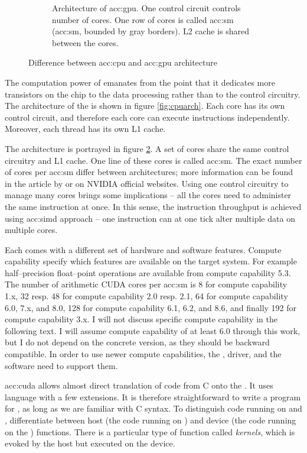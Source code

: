 \begin{figure}
\begin{subfigure}[t]{0.47\textwidth}
        \caption{Architecture of \acrshort*{acc:gpu}. One control circuit controls number of cores. One row of cores is called \acrlong{acc:sm} (\acrshort{acc:sm}, bounded by gray borders). L2 cache is shared between the cores.}
        \label{fig:gpuarch}
    \end{subfigure}
    \caption{Difference between \acrshort*{acc:cpu} and \acrshort*{acc:gpu} architecture}
\end{figure}

The computation power of \gpu emanates from the point that it dedicates more transistors on the chip to the data processing rather than to the control circuitry. The architecture of the \cpu is shown in figure \ref{fig:cpuarch}. Each core has its own control circuit, and therefore each core can execute instructions independently. Moreover, each thread has its own L1 cache.

The \gpu{} architecture is portrayed in figure \ref{fig:gpuarch}. A set of cores share the same control circuitry and L1 cache. One line of these cores is called \acrfull{acc:sm}. The exact number of cores per \acrshort{acc:sm} differ between architectures; more information can be found in the article by \citet{NVIDIAhistory} or on NVIDIA official websites. Using one control circuitry to manage many cores brings some implications -- all the cores need to administer the same instruction at once. In this sense, the instruction throughput is achieved using \acrfull{acc:simd} approach -- one instruction can at one tick alter multiple data on multiple cores.

Each \gpu comes with a different set of hardware and software features. Compute capability specify which features are available on the target system. For example half--precision float--point operations are available from compute capability 5.3. The number of arithmetic CUDA cores per \acrshort{acc:sm} is 8 for compute capability 1.x, 32 resp. 48 for compute capability 2.0 resp. 2.1, 64 for compute capability 6.0, 7.x, and 8.0, 128 for compute capability 6.1, 6.2, and 8.6, and finally 192 for compute capability 3.x. I will not discuss specific compute capability in the following text. I will assume compute capability of at least 6.0 through this work, but I do not depend on the concrete version, as they should be backward compatible. In order to use newer compute capabilities, the \gpu, driver, and the software need to support them.

\acrlong{acc:cuda} allows almost direct translation of code from C onto the \gpu. It uses \cpp language with a few extensions. It is therefore straightforward to write a program for \gpuns, as long as we are familiar with C syntax. To distinguish code running on \cpu and \gpu, \cuda differentiate between host (the code running on \cpu) and device (the code running on the \gpu) functions. There is a particular type of function called \emph{kernels}, which is evoked by the host but executed on the device.

